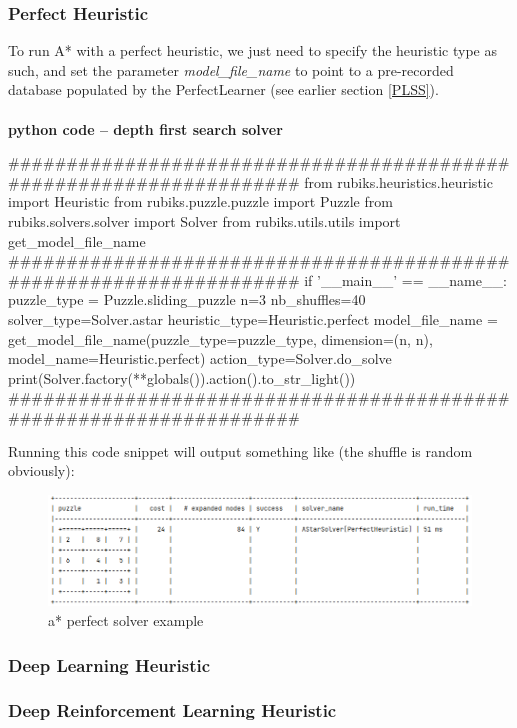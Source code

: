 \subsubsection{Perfect Heuristic}
To run A{*} with a perfect heuristic, we just need to specify the heuristic type as such, and set the parameter \textit{model\_file\_name} to point to a pre-recorded database populated by the PerfectLearner (see earlier section \ref{PLSS}).


\afblue
\paragraph{}{\textbf{python code -- depth first search solver}}
\begin{python}
####################################################################
from rubiks.heuristics.heuristic import Heuristic
from rubiks.puzzle.puzzle import Puzzle
from rubiks.solvers.solver import Solver
from rubiks.utils.utils import get_model_file_name
####################################################################
if '__main__' == __name__:
    puzzle_type = Puzzle.sliding_puzzle
    n=3
    nb_shuffles=40
    solver_type=Solver.astar
    heuristic_type=Heuristic.perfect
    model_file_name = get_model_file_name(puzzle_type=puzzle_type,
                                          dimension=(n, n),
                                          model_name=Heuristic.perfect)
    action_type=Solver.do_solve
    print(Solver.factory(**globals()).action().to_str_light())
####################################################################
\end{python}
\black
Running this code snippet will output something like (the shuffle is random obviously):


\begin{figure}[H]
\centering
\includegraphics[scale=0.5]{./Figures/exampleastarperfectsolver}
\caption[Examples]{a* perfect solver example}
\label{fig:exampleastarperfectsolver}
\end{figure}



\subsubsection{Deep Learning Heuristic}
\subsubsection{Deep Reinforcement Learning Heuristic}


